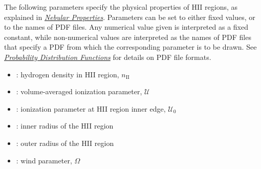 \documentclass[letterpaper,10pt,english]{sphinxmanual}
\begin{document}
The following parameters specify the physical properties of HII
regions, as explained in {\hyperref[cloudy:sssec\string-cloudy\string-nebular\string-properties]{\emph{Nebular Properties}}}. Parameters can be set to either fixed values, or to the
names of PDF files. Any numerical value given is interpreted as a
fixed constant, while non-numerical values are interpreted as the
names of PDF files that specify a PDF from which the corresponding
parameter is to be drawn. See {\hyperref[pdfs:sec\string-pdfs]{\emph{Probability Distribution Functions}}} for details on PDF file
formats.
\begin{itemize}
\item {} 
: hydrogen density in HII region,
\(n_{\mathrm{II}}\)

\item {} 
: volume-averaged ionization
parameter, \(\mathcal{U}\)

\item {} 
: ionization parameter at
HII region inner edge, \(\mathcal{U}_0\)

\item {} 
: inner radius of the HII region

\item {} 
: outer radius of the HII region

\item {} 
: wind parameter,
\(\Omega\)

\end{itemize}
\end{document}
